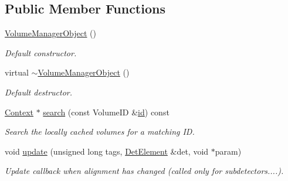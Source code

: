 \subsection*{Public Member Functions}
\begin{DoxyCompactItemize}
\item 
\hyperlink{class_d_d4hep_1_1_geometry_1_1_volume_manager_object_ab52b36882ffec6a6b6023ae93f3d19bd}{VolumeManagerObject} ()
\begin{DoxyCompactList}\small\item\em Default constructor. \item\end{DoxyCompactList}\item 
virtual \hyperlink{class_d_d4hep_1_1_geometry_1_1_volume_manager_object_a9c8a75f018315e09a2d5180cacd45468}{$\sim$VolumeManagerObject} ()
\begin{DoxyCompactList}\small\item\em Default destructor. \item\end{DoxyCompactList}\item 
\hyperlink{class_d_d4hep_1_1_geometry_1_1_volume_manager_context}{Context} $\ast$ \hyperlink{class_d_d4hep_1_1_geometry_1_1_volume_manager_object_a4ce40901516b6f1e4bb0db611f46eacd}{search} (const VolumeID \&\hyperlink{class_d_d4hep_1_1_geometry_1_1_volume_manager_object_a34cf251ba79ecddf50f9fdaf50265968}{id}) const 
\begin{DoxyCompactList}\small\item\em Search the locally cached volumes for a matching ID. \item\end{DoxyCompactList}\item 
void \hyperlink{class_d_d4hep_1_1_geometry_1_1_volume_manager_object_a61234dfd7ac8a594ec2c9a0dcb6a274d}{update} (unsigned long tags, \hyperlink{class_d_d4hep_1_1_geometry_1_1_det_element}{DetElement} \&det, void $\ast$param)
\begin{DoxyCompactList}\small\item\em Update callback when alignment has changed (called only for subdetectors....). \item\end{DoxyCompactList}\end{DoxyCompactItemize}
